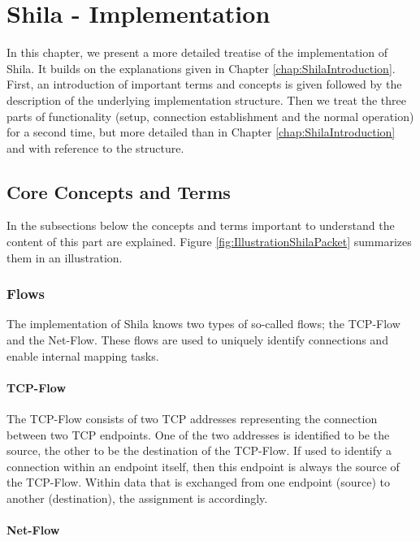 \chapter{Shila - Implementation}
\label{chap:ShilaImplementation}

In this chapter, we present a more detailed treatise of the implementation of Shila. It builds on the explanations given in Chapter \ref{chap:ShilaIntroduction}. First, an introduction of important terms and concepts is given followed by the description of the underlying implementation structure. Then we treat the three parts of functionality (setup, connection establishment and the normal operation) for a second time, but more detailed than in Chapter \ref{chap:ShilaIntroduction} and with reference to the structure.

\section{Core Concepts and Terms}

In the subsections below the concepts and terms important to understand the content of this part are explained. Figure \ref{fig:IllustrationShilaPacket} summarizes them in an illustration.

\subsection*{Flows}
\label{subsec:ShilaImplementationImportantConceptsFlows}

The implementation of Shila knows two types of so-called flows; the TCP-Flow and the Net-Flow.  These flows are used to uniquely identify connections and enable internal mapping tasks.

\subsubsection*{TCP-Flow}

The TCP-Flow consists of two TCP addresses representing the connection between two TCP endpoints. One of the two addresses is identified to be the source, the other to be the destination of the TCP-Flow. If used to identify a connection within an endpoint itself, then this endpoint is always the source of the TCP-Flow. Within data that is exchanged from one endpoint (source) to another (destination), the assignment is accordingly.

\subsubsection*{Net-Flow}

